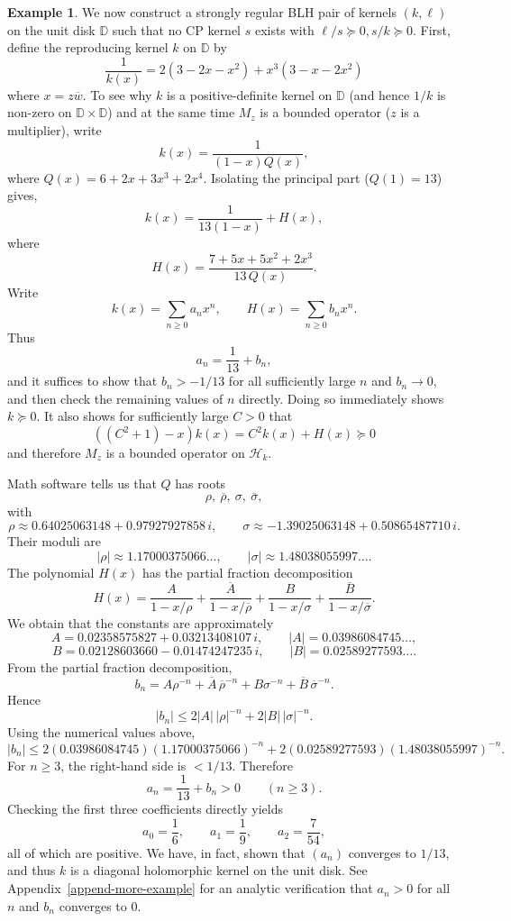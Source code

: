 \documentclass[a4paper,reqno,index]{amsart}
\numberwithin{equation}{section}
\newcommand{\DD}{\mathbb{D}}
\newcommand{\cH}{\mathcal{H}}
\newcommand{\ol}[1]{\overline{#1}}
\theoremstyle{definition}
\newtheorem{example}[theorem]{Example}
\begin{document}
\begin{example}\rm 
\label{eg:recursivel} We now construct a strongly regular BLH pair of kernels $(k, \ell)$ on the unit disk $\DD$ such that no CP kernel $s$ exists with $\ell/s\succeq 0, s/k\succeq 0.$
First, define the reproducing kernel $k$ on $\mathbb{D}$ by
\[
 \frac{1}{k(x)} = 2(3-2x-x^2)+x^3(3-x-2x^2)
\]
 where $x=z\ol{w}.$  To see why $k$ is a   positive-definite kernel
on $\mathbb{D}$  (and hence $1/k$ is non-zero on $\mathbb{D}\times \mathbb{D}$) and at the same time $M_z$ is a bounded operator ($z$ is a multiplier),  write 
\[
k(x)=\frac{1}{(1-x)Q(x)},
\]
where $Q(x)=6+2x+3x^3+2x^4.$ Isolating the principal part ($Q(1)=13$) gives,
\[
k(x)=\frac{1}{13(1-x)}+H(x),
\]
where
\[
H(x)=\frac{7+5x+5x^2+2x^3}{13\,Q(x)}.
\]
Write
\[
k(x)=\sum_{n\ge 0} a_n x^n,
\qquad
H(x)=\sum_{n\ge 0} b_n x^n.
\]
Thus
\[
a_n=\frac{1}{13}+b_n,
\]
and it suffices to show that  $b_n> -1/13$ for all sufficiently large $n$ and  $b_n\to 0,$ and then check the remaining values of $n$ directly. Doing so immediately shows $k\succeq 0$. It also shows for sufficiently large $C>0$ that
\[
 ((C^2+1)-x)k(x) = C^2 k(x) + H(x) \succeq 0
\]
and therefore $M_z$ is a bounded operator on $\cH_k.$


Math software tells us that $Q$ has roots
\[
\rho,\ \overline{\rho},\ \sigma,\ \overline{\sigma},
\]
with
\[
\rho \approx 0.64025063148+0.97927927858\,i,
\qquad
\sigma \approx -1.39025063148+0.50865487710\,i.
\]
Their moduli are
\[
|\rho|\approx 1.17000375066\ldots,
\qquad
|\sigma|\approx 1.48038055997\ldots.
\]
The polynomial $H(x)$ has the partial fraction decomposition
\[
H(x)=\frac{A}{1-x/\rho}+\frac{\overline A}{1-x/\overline\rho}
+\frac{B}{1-x/\sigma}+\frac{\overline B}{1-x/\overline\sigma}.
\]
We obtain that the constants are approximately
\[
A=0.02358575827+0.03213408107\,i,
\qquad
|A|=0.03986084745\ldots,
\]
\[
B=0.02128603660-0.01474247235\,i,
\qquad
|B|=0.02589277593\ldots.
\]
From the partial fraction decomposition,
\[
b_n=A\rho^{-n}+\overline A\,\overline\rho^{-n}
+B\sigma^{-n}+\overline B\,\overline\sigma^{-n}.
\]
Hence
\[
|b_n|
\le 2|A|\,|\rho|^{-n}+2|B|\,|\sigma|^{-n}.
\]
Using the numerical values above,
\[
|b_n|
\le 2(0.03986084745)(1.17000375066)^{-n}
+2(0.02589277593)(1.48038055997)^{-n}.
\]
For \(n\ge 3\), the right-hand side is \(<1/13\). Therefore
\[
a_n=\frac{1}{13}+b_n>0
\qquad (n\ge 3).
\]
Checking the first three coefficients directly yields
\[
a_0=\frac16,\qquad a_1=\frac19,\qquad a_2=\frac7{54},
\]
all of which are positive. We have, in fact, shown that $(a_n)$ converges to $1/13$, 
{and thus $k$ is  a diagonal holomorphic kernel on the unit disk}.
See Appendix~\ref{append-more-example} for an analytic verification
that $a_n>0$ for all $n$ and $b_n$ converges to $0.$


\end{example}
\end{document}
